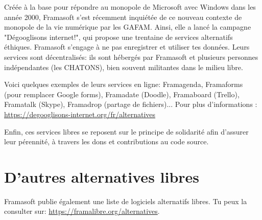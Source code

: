 \documentclass[12pt]{../fiche}
\begin{document}
	Créée à la base pour répondre au monopole de Microsoft avec Windows dans les année 2000, Framasoft s'est récemment inquiétée de ce nouveau contexte de monopole de la vie numérique par les GAFAM. Ainsi, elle a lancé la campagne "Dégooglisons internet!", qui propose une trentaine de services alternatifs éthiques. Framasoft s'engage à ne pas enregistrer et utiliser tes données. Leurs services sont décentralisés: ils sont hébergés par Framasoft et plusieurs personnes indépendantes (les CHATONS), bien souvent militantes dans le milieu libre.
	
	Voici quelques exemples de leurs services en ligne: Framagenda, Framaforms (pour remplacer Google forms), Framadate (Doodle), Framaboard (Trello), Framatalk (Skype), Framadrop (partage de fichiers)... Pour plus d'informations : \url{https://degooglisons-internet.org/fr/alternatives}
	
	
	
	Enfin, ces services libres se reposent sur le principe de solidarité afin d'assurer leur pérennité, à travers les dons et contributions au code source.



	\section*{D'autres alternatives libres}
		Framasoft publie également une liste de logiciels alternatifs libres. Tu peux la consulter sur: \newline \url{https://framalibre.org/alternatives}. 

	
	
\end{document}
